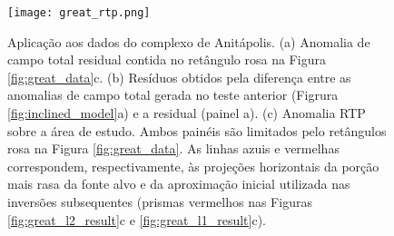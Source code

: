 \pagebreak

\begin{figure}[!htb]
	\centering
	\texttt{[image: great\_rtp.png]}
	\caption{Aplicação aos dados do complexo de Anitápolis. 
		(a) Anomalia de campo total residual contida no retângulo rosa na Figura \ref{fig:great_data}c. (b) Resíduos obtidos pela diferença entre as anomalias de campo total gerada no teste anterior (Figrura \ref{fig:inclined_model}a) e a residual (painel a). (c) Anomalia RTP sobre a área de estudo. Ambos painéis são limitados pelo retângulos rosa na Figura \ref{fig:great_data}. As linhas azuis e vermelhas correspondem, respectivamente, às projeções horizontais da porção mais rasa da fonte alvo e da aproximação inicial utilizada nas inversões subsequentes (prismas vermelhos nas Figuras \ref{fig:great_l2_result}c e 
		\ref{fig:great_l1_result}c).
	}
	\label{fig:great_model_rtp}
\end{figure}

\pagebreak

